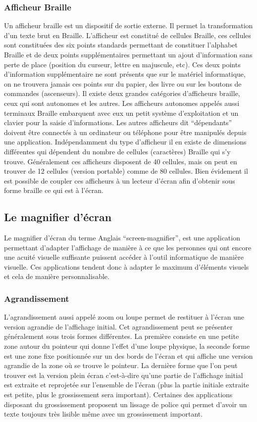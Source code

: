 \documentclass[french,a4paper]{report}
\begin{document}
\subsubsection{Afficheur Braille}
Un afficheur braille est un dispositif de sortie externe. Il permet la
transformation d'un texte brut en Braille. L'afficheur est constitué de cellules
Braille, ces cellules sont constituées des six points standards permettant de
constituer l'alphabet Braille et de deux points supplémentaires permettant un
ajout d'information sans perte de place (position du curseur, lettre en
majuscule, etc). Ces deux points d'information supplémentaire ne sont présents
que sur le matériel informatique, on ne trouvera jamais ces points sur du
papier, des livre ou sur les boutons de commandes (ascenseurs). \newline
Il existe deux grandes catégories d'afficheurs braille, ceux qui sont autonomes et les autres. Les afficheurs autonomes appelés aussi terminaux Braille embarquent avec eux un petit système d'exploitation et un clavier pour la saisie d'informations. Les autres afficheurs dit \enquote{dépendants} doivent être connectés à un ordinateur ou téléphone pour être manipulés depuis une application.
\newline
Indépendamment du type d'afficheur il en existe de dimensions différentes qui dépendent du nombre de cellules (caractères) Braille qui s'y trouve. Généralement ces afficheurs disposent de 40 cellules, mais on peut en trouver de 12 cellules (version portable) comme de 80 cellules.
\newline
Bien évidement il est possible de coupler ces afficheurs à un lecteur d'écran afin d'obtenir sous forme braille ce qui est à l'écran.
\subsection{Le magnifier d'écran}
Le magnifier d'écran du terme Anglais ``screen-magnifier'', est une application permettant d'adapter l'affichage de manière à ce que les personnes qui ont encore une acuité visuelle suffisante puissent accéder à l'outil informatique de manière visuelle. Ces applications tendent donc à adapter le maximum d'éléments visuels et cela de manière personnalisable.
\subsubsection{Agrandissement}
L'agrandissement aussi appelé zoom ou loupe permet de restituer à l'écran une version agrandie de l'affichage initial. Cet agrandissement peut se présenter généralement sous trois formes différentes. La première consiste en une petite zone autour du pointeur qui donne l'effet d'une loupe physique, la seconde forme est une zone fixe positionnée sur un des bords de l'écran et qui affiche une version agrandie de la zone où se trouve le pointeur. La dernière forme que l'on peut trouver est la version plein écran c'est-à-dire qu'une partie de l'affichage initial est extraite et reprojetée sur l'ensemble de l'écran (plus la partie initiale extraite est petite, plus le grossissement sera important). Certaines des applications disposant du grossissement proposent un lissage de police qui permet d'avoir un texte toujours très lisible même avec un grossissement important.
\end{document}
